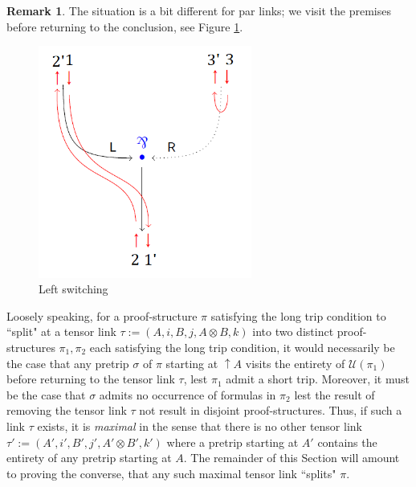 \documentclass[12pt]{article}
\theoremstyle{plain}
\theoremstyle{definition}
\newtheorem{remark}[thm]{Remark}
\newcommand{\call}[1]{\mathcal{#1}}
\begin{document}
\begin{remark}
The situation is a bit different for par links; we visit the premises before returning to the conclusion, see Figure \ref{fig:stays_contained_explained_par}.
\begin{figure}[h]
    \centering
    \includegraphics[width = 7cm]{ParLeftSwitching.png}
    \caption{Left switching}
    \label{fig:stays_contained_explained_par}
\end{figure}
\end{remark}
Loosely speaking, for a proof-structure $\pi$ satisfying the long trip condition to ``split" at a tensor link $\tau := (A,i,B,j,A\otimes B,k)$ into two distinct proof-structures $\pi_1,\pi_2$ each satisfying the long trip condition, it would necessarily be the case that any pretrip $\sigma$ of $\pi$ starting at $\uparrow A$ visits the entirety of $\call{U}(\pi_1)$ before returning to the tensor link $\tau$, lest $\pi_1$ admit a short trip. Moreover, it must be the case that $\sigma$ admits no occurrence of formulas in $\pi_2$ lest the result of removing the tensor link $\tau$ not result in disjoint proof-structures. Thus, if such a link $\tau$ exists, it is \emph{maximal} in the sense that there is no other tensor link $\tau' := (A',i',B',j',A' \otimes B',k')$ where a pretrip starting at $A'$ contains the entirety of any pretrip starting at $A$. The remainder of this Section will amount to proving the converse, that any such maximal tensor link ``splits" $\pi$.
\end{document}
